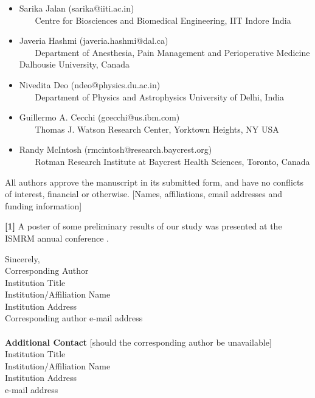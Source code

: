 \documentclass[NETN,manuscript]{stjour-new}
\begin{document}
\begin{itemize}
\item Sarika Jalan (sarika@iiti.ac.in) \\
\small
~~~ Centre for Biosciences and Biomedical Engineering, IIT Indore India
\normalsize
\item Javeria Hashmi (javeria.hashmi@dal.ca) \\
\small
~~~ Department of Anesthesia, Pain Management and Perioperative Medicine Dalhousie University, Canada
\normalsize
\item Nivedita Deo (ndeo@physics.du.ac.in) \\
\small
~~~ Department of Physics and Astrophysics University of Delhi, India
\normalsize
\item Guillermo A. Cecchi (gcecchi@us.ibm.com) \\
\small
~~~ Thomas J. Watson Research Center, Yorktown Heights, NY USA
\normalsize
\item Randy McIntosh (rmcintosh@research.baycrest.org) \\
\small
~~~ Rotman Research Institute at Baycrest Health Sciences, Toronto, Canada
\normalsize
\end{itemize}

All authors approve the manuscript in its submitted form, and have no conflicts of interest,
financial or otherwise. [Names, affiliations, email addresses and funding information]

\textbf{[1]} A poster of some preliminary results of our study was presented at the ISMRM annual
conference \citep{bergerOpenSourceRandom2021}.

Sincerely, \\
Corresponding Author \\
Institution Title \\
Institution/Affiliation Name \\
Institution Address \\
Corresponding author e-mail address \\

~\\
\textbf{Additional Contact} [should the corresponding author be unavailable] \\
Institution Title \\
Institution/Affiliation Name \\
Institution Address \\
e-mail address \\


\end{document}
